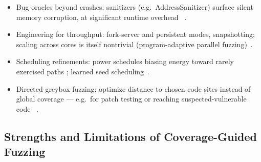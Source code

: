 \begin{itemize}
  \item Bug oracles beyond crashes: sanitizers (e.g.\ AddressSanitizer) surface silent memory
    corruption, at significant runtime overhead~\cite{zhang_debloating_nodate}
    .
  \item Engineering for throughput: fork-server and persistent modes, snapshotting; scaling across
    cores is itself nontrivial (program-adaptive parallel fuzzing)~\cite{zhou_kraken_2025}.
  \item Scheduling refinements: power schedules biasing energy toward rarely exercised paths
    ; learned seed scheduling~\cite{wang_reinforcement_2021}.
  \item Directed greybox fuzzing: optimize distance to chosen code sites instead of global
    coverage --- e.g.\ for patch testing or reaching suspected-vulnerable
    code~\cite{chen_critical_nodate,kwon_optimization-directed_2025}
    .
\end{itemize}

\subsection{Strengths and Limitations of Coverage-Guided Fuzzing}\label{sec:fuzzing-limitations}

